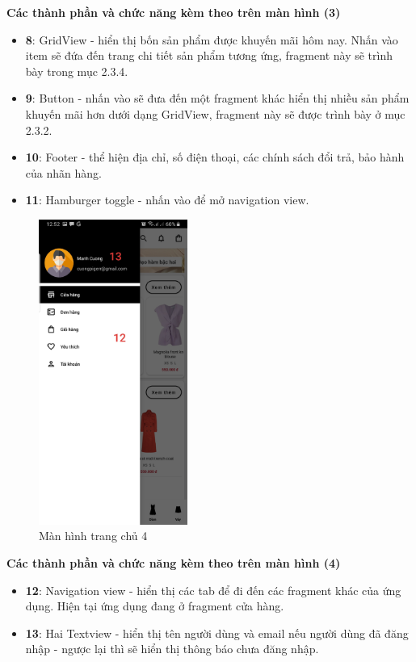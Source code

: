 \documentclass[12pt]{article}
\begin{document}
\indent \textbf{Các thành phần và chức năng kèm theo trên màn hình (3)}
\begin{itemize}
    \item \textbf{8}: GridView - hiển thị bốn sản phẩm được khuyến mãi hôm nay. Nhấn vào item sẽ đứa đến trang chi tiết sản phẩm tương ứng, fragment này sẽ trình bày trong mục 2.3.4.
    \item \textbf{9}: Button - nhấn vào sẽ đưa đến một fragment khác hiển thị nhiều sản phẩm khuyến mãi hơn dưới dạng GridView, fragment này sẽ được trình bày ở mục 2.3.2.
    \item \textbf{10}: Footer - thể hiện địa chỉ, số điện thoại, các chính sách đổi trả, bảo hành của nhãn hàng.
    \item \textbf{11}: Hamburger toggle - nhấn vào để mở navigation view.
\end{itemize}

\newpage
\begin{figure}[H]
    \centering
    \includegraphics[height=10cm]{images/14.png}
    \caption{Màn hình trang chủ 4}
\end{figure}

\indent \textbf{Các thành phần và chức năng kèm theo trên màn hình (4)}
\begin{itemize}
    \item \textbf{12}: Navigation view - hiển thị các tab để đi đến các fragment khác của ứng dụng. Hiện tại ứng dụng đang ở fragment cửa hàng.
    \item \textbf{13}: Hai Textview - hiển thị tên người dùng và email nếu người dùng đã đăng nhập - ngược lại thì sẽ hiển thị thông báo chưa đăng nhập.
\end{itemize}
\end{document}
